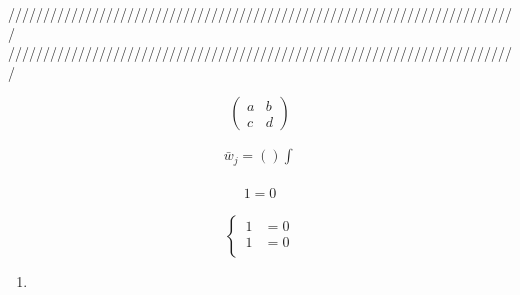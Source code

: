 \documentclass[dvipdfmx]{report} %
\begin{document}
\newpage




\noindent
/////////////////////////////////////////////////////////////////////////\\
/////////////////////////////////////////////////////////////////////////

\begin{equation*}
\begin{pmatrix}
   a & b \\
   c & d
\end{pmatrix}
\end{equation*}

\begin{equation*}
\begin{split}
	\bar{w}_j = \left( \right) \int^{}_{}
\end{split}
\end{equation*}

\begin{tcolorbox}[title=メモ用]
\begin{eqnarray*}
	1 = 0
\end{eqnarray*}
\end{tcolorbox}

\begin{equation}
\left\{ \,
\begin{aligned}
	1 &= 0\\
	1 &= 0\\
\end{aligned}
\right.
\end{equation}


\begin{enumerate}[(1)\,]
\item{}
\end{enumerate}
\end{document}
